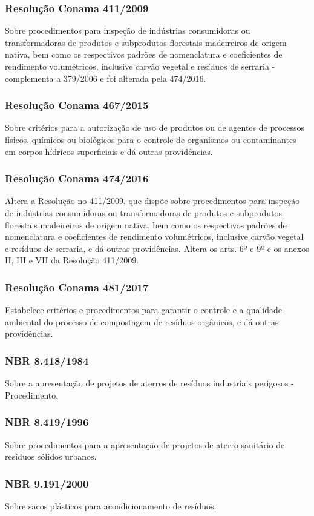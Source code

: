 \begin{subapend}
\begin{subsubapend}
		\subsubsection{Resolução Conama 411/2009}
		Sobre procedimentos para inspeção de indústrias consumidoras ou transformadoras de produtos e subprodutos florestais madeireiros de origem nativa, bem como os respectivos padrões de nomenclatura e coeficientes de rendimento volumétricos, inclusive carvão vegetal e resíduos de serraria - complementa a 379/2006 e foi alterada pela 474/2016.
		\subsubsection{Resolução Conama 467/2015}
		Sobre critérios para a autorização de uso de produtos ou de agentes de processos físicos, químicos ou biológicos para o controle de organismos ou contaminantes em corpos hídricos superficiais e dá outras providências.
		\subsubsection{Resolução Conama 474/2016}
		Altera a Resolução no 411/2009, que dispõe sobre procedimentos para inspeção de indústrias consumidoras ou transformadoras de produtos e subprodutos florestais madeireiros de origem nativa, bem como os respectivos padrões de nomenclatura e coeficientes de rendimento volumétricos, inclusive carvão vegetal e resíduos de serraria, e dá outras providências. Altera os arts. 6º e 9º e os anexos II, III e VII da Resolução 411/2009.
		\subsubsection{Resolução Conama 481/2017}
		Estabelece critérios e procedimentos para garantir o controle e a qualidade ambiental do processo de compostagem de resíduos orgânicos, e dá outras providências.
		\subsubsection{NBR 8.418/1984}
		Sobre a apresentação de projetos de aterros de resíduos industriais perigosos - Procedimento.
		\subsubsection{NBR 8.419/1996}
		Sobre procedimentos para a apresentação de projetos de aterro sanitário de resíduos sólidos urbanos.
		\subsubsection{NBR 9.191/2000}
		Sobre sacos plásticos para acondicionamento de resíduos.

\end{subsubapend}
\end{subapend}
